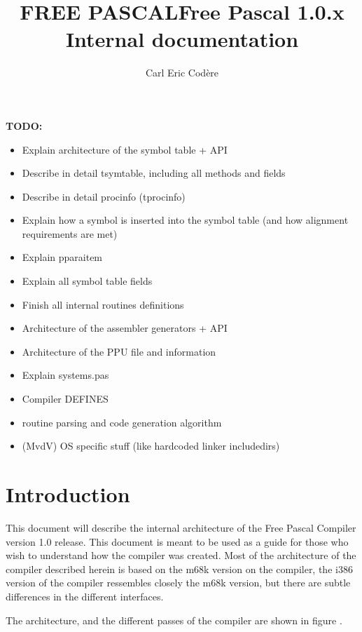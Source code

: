 \documentclass [a4paper,12pt]{article}
\title{FREE PASCAL}
\title{Free Pascal 1.0.x Internal documentation}
\author{Carl Eric Cod\`{e}re}
\begin{document}
\maketitle
\tableofcontents
\newpage
\listoffigures
\newpage

\textbf{TODO:}
\begin{itemize}
\item Explain architecture of the symbol table + API
\item Describe in detail tsymtable, including all methods and fields
\item Describe in detail procinfo (tprocinfo)
\item Explain how a symbol is inserted into the symbol table (and how alignment requirements are met)
\item Explain pparaitem
\item Explain all symbol table fields
\item Finish all internal routines definitions
\item Architecture of the assembler generators + API
\item Architecture of the PPU file and information
\item Explain systems.pas
\item Compiler DEFINES
\item routine parsing and code generation algorithm
\item (MvdV) OS specific stuff (like hardcoded linker includedirs)
\end{itemize}

\section{Introduction}
\label{sec:introductionappendix}

This document will describe the internal architecture of the Free Pascal
Compiler version 1.0 release. This document is meant to be used as a guide
for those who wish to understand how the compiler was created. Most of the
architecture of the compiler described herein is based on the m68k version
on the compiler, the i386 version of the compiler ressembles closely the
m68k version, but there are subtle differences in the different interfaces.

The architecture, and the different passes of the compiler are shown in
figure .
\end{document}
